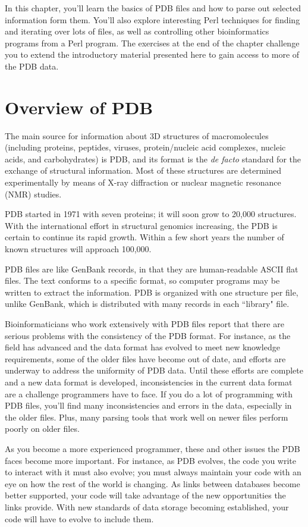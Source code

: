In this chapter, you'll learn the basics of PDB files and how to parse out selected information form them. You'll also explore interesting Perl techniques for finding and iterating over lots of files, as well as controlling other bioinformatics programs from a Perl program. The exercises at the end of the chapter challenge you to extend the introductory material presented here to gain access to more of the PDB data.

\section{Overview of PDB}
The main source for information about 3D structures of macromolecules (including proteins, peptides, viruses, protein/nucleic acid complexes, nucleic acids, and carbohydrates) is PDB, and its format is the \textit{de facto} standard for the exchange of structural information. Most of these structures are determined experimentally by means of X-ray diffraction or nuclear magnetic resonance (NMR) studies.

PDB started in 1971 with seven proteins; it will soon grow to 20,000 structures. With the international effort in structural genomics increasing, the PDB is certain to continue its rapid growth. Within a few short years the number of known structures will approach 100,000.  

PDB files are like GenBank records, in that they are human-readable ASCII flat files. The text conforms to a specific format, so computer programs may be written to extract the information. PDB is organized with one structure per file, unlike GenBank, which is distributed with many records in each ``library" file.

Bioinformaticians who work extensively with PDB files report that there are serious problems with the consistency of the PDB format. For instance, as the field has advanced and the data format has evolved to meet new knowledge requirements, some of the older files have become out of date, and efforts are underway to address the uniformity of PDB data. Until these efforts are complete and a new data format is developed, inconsistencies in the current data format are a challenge programmers have to face. If you do a lot of programming with PDB files, you'll find many inconsistencies and errors in the data, especially in the older files. Plus, many parsing tools that work well on newer files perform poorly on older files.

As you become a more experienced programmer, these and other issues the PDB faces become more important. For instance, as PDB evolves, the code you write to interact with it must also evolve; you must always maintain your code with an eye on how the rest of the world is changing. As links between databases become better supported, your code will take advantage of the new opportunities the links provide. With new standards of data storage becoming established, your code will have to evolve to include them.

